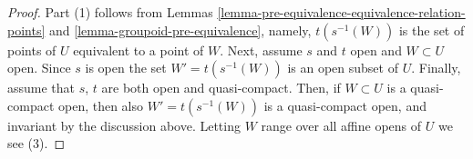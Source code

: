 \documentclass{stacks-project}
\theoremstyle{plain}
\theoremstyle{definition}
\theoremstyle{remark}
\numberwithin{equation}{subsection}
\begin{document}
\begin{proof}
Part (1) follows from
Lemmas \ref{lemma-pre-equivalence-equivalence-relation-points} and
\ref{lemma-groupoid-pre-equivalence}, namely, $t(s^{-1}(W))$
is the set of points of $U$ equivalent to a point of $W$.
Next, assume $s$ and $t$ open and $W \subset U$ open.
Since $s$ is open the set $W' = t(s^{-1}(W))$ is an open subset of $U$.
Finally, assume that $s$, $t$ are both open and quasi-compact.
Then, if $W \subset U$ is a quasi-compact open, then also
$W' = t(s^{-1}(W))$ is a quasi-compact open, and invariant by the
discussion above. Letting $W$ range over all affine opens of $U$
we see (3).
\end{proof}
\end{document}
